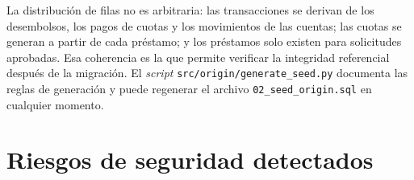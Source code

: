 \begin{table}[H]
  \centering
  \caption{Conteo de filas en el sistema de origen}
  \label{tab:conteos-origen}
\end{table}

La distribución de filas no es arbitraria: las transacciones se derivan de
los desembolsos, los pagos de cuotas y los movimientos de las cuentas; las
cuotas se generan a partir de cada préstamo; y los préstamos solo existen
para solicitudes aprobadas. Esa coherencia es la que permite verificar la
integridad referencial después de la migración. El \emph{script}
\texttt{src/origin/generate\_seed.py} documenta las reglas de generación y
puede regenerar el archivo \texttt{02\_seed\_origin.sql} en cualquier momento.

\section{Riesgos de seguridad detectados}
\label{sec:riesgos}

